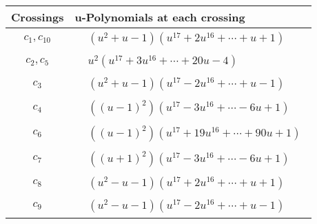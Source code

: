 \documentclass[1p]{elsarticle_modified}
\theoremstyle{definition}
\begin{document}
\begin{tabular}{m{50pt}|m{274pt}}
Crossings & \hspace{64pt}u-Polynomials at each crossing \\
\hline $$\begin{aligned}c_{1},c_{10}\end{aligned}$$&$\begin{aligned}
&(u^2+u-1)(u^{17}+2 u^{16}+\cdots+u+1)
\end{aligned}$\\
\hline $$\begin{aligned}c_{2},c_{5}\end{aligned}$$&$\begin{aligned}
&u^2(u^{17}+3 u^{16}+\cdots+20 u-4)
\end{aligned}$\\
\hline $$\begin{aligned}c_{3}\end{aligned}$$&$\begin{aligned}
&(u^2+u-1)(u^{17}-2 u^{16}+\cdots+u-1)
\end{aligned}$\\
\hline $$\begin{aligned}c_{4}\end{aligned}$$&$\begin{aligned}
&((u-1)^2)(u^{17}-3 u^{16}+\cdots-6 u+1)
\end{aligned}$\\
\hline $$\begin{aligned}c_{6}\end{aligned}$$&$\begin{aligned}
&((u-1)^2)(u^{17}+19 u^{16}+\cdots+90 u+1)
\end{aligned}$\\
\hline $$\begin{aligned}c_{7}\end{aligned}$$&$\begin{aligned}
&((u+1)^2)(u^{17}-3 u^{16}+\cdots-6 u+1)
\end{aligned}$\\
\hline $$\begin{aligned}c_{8}\end{aligned}$$&$\begin{aligned}
&(u^2- u-1)(u^{17}+2 u^{16}+\cdots+u+1)
\end{aligned}$\\
\hline $$\begin{aligned}c_{9}\end{aligned}$$&$\begin{aligned}
&(u^2- u-1)(u^{17}-2 u^{16}+\cdots+u-1)
\end{aligned}$\\
\hline
\end{tabular}\newpage\renewcommand{\arraystretch}{1}
\end{document}
